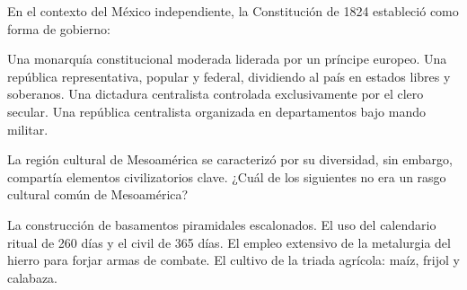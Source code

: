 \documentclass[12pt]{evaluasep}
\begin{document}
\begin{questions}
    \question En el contexto del México independiente, la Constitución de 1824 estableció como forma de gobierno:
    \begin{choices}
        \choice Una monarquía constitucional moderada liderada por un príncipe europeo.
        \CorrectChoice Una república representativa, popular y federal, dividiendo al país en estados libres y soberanos.
        \choice Una dictadura centralista controlada exclusivamente por el clero secular.
        \choice Una república centralista organizada en departamentos bajo mando militar.
    \end{choices}

    \question La región cultural de Mesoamérica se caracterizó por su diversidad, sin embargo, compartía elementos civilizatorios clave. ¿Cuál de los siguientes no era un rasgo cultural común de Mesoamérica?
    \begin{choices}
        \choice La construcción de basamentos piramidales escalonados.
        \choice El uso del calendario ritual de 260 días y el civil de 365 días.
        \CorrectChoice El empleo extensivo de la metalurgia del hierro para forjar armas de combate.
        \choice El cultivo de la triada agrícola: maíz, frijol y calabaza.
    \end{choices}

\end{questions}
\end{document}
